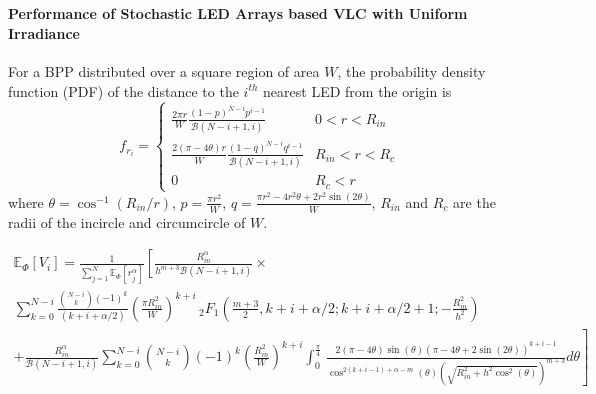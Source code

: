 \documentclass{beamer}
\providecommand{\sbrak}[1]{\ensuremath{{}\left[#1\right]}}
\providecommand{\lsbrak}[1]{\ensuremath{{}\left[#1\right.}}
\providecommand{\rsbrak}[1]{\ensuremath{{}\left.#1\right]}}
\providecommand{\brak}[1]{\ensuremath{\left(#1\right)}}
\theoremstyle{remark}
\begin{document}
\begin{frame}
\frametitle{\,}
\framesubtitle{Performance of Stochastic LED Arrays based VLC with Uniform Irradiance}

\begin{list}{}{}

\vfill
\item<1->
\footnotesize{
For a BPP distributed over a square region of area $W$,
the probability density function (PDF) of the distance to the $i^{th}$ nearest LED from the origin
is
%
\begin{equation}
f_{r_i}=\begin{cases} 
      \frac{2\pi r}{W}\frac{\brak{1-p}^{N-i}p^{i-1}}{\mathcal{B}\brak{N-i+1,i}} & 0 < r < R_{in}\\
      \frac{2\brak{\pi-4\theta} r}{W}\frac{\brak{1-q}^{N-i}q^{i-1}}{\mathcal{B}\brak{N-i+1,i}} & R_{in} < r < R_c \\
      0 &  R_c < r
   \end{cases}\nonumber
   \end{equation}
 where $\theta=\cos^{-1}\brak{R_{in}/r}$, $p=\frac{\pi r^2}{W}$, $q=\frac{\pi r^2-4r^2\theta+2 r^2\sin\brak{2\theta}}{W}$, $R_{in}$ and $R_c$ are the radii of the incircle and circumcircle of $W$.
 }
 \vfill

 \item<2>
\tiny{
\begin{multline}
\label{e_phi}
\mathbb{E}_{\Phi}\sbrak{V_i}
= \frac{1}{\sum_{j=1}^N\mathbb{E}_{\Phi}\sbrak{r_j^{\alpha}} }\lsbrak{\frac{R_{in}^{\alpha}}{h^{m+3}\mathcal{B}\brak{N-i+1,i}} \times} \\
\sum_{k=0}^{N-i}\frac{\binom{N-i}{k}(-1)^k}{\brak{k+i+\alpha/2}}\brak{\frac{\pi R_{in}^2}{W}}^{k+i}
   \,_2F_1\brak{\frac{m+3}{2},k+i+\alpha/2;k+i+\alpha/2+1;-\frac{R_{in}^2}{h^2}} 
\\
\rsbrak{+ \frac{R_{in}^{\alpha}}{\mathcal{B}\brak{N-i+1,i}}\sum_{k=0}^{N-i}\binom{N-i}{k}(-1)^k\brak{\frac{R_{in}^2}{W}}^{k+i}
   \int_{0}^{\frac{\pi}{4}} \frac{}{}
   \frac{2\brak{\pi-4\theta}\sin\brak{\theta}\brak{\pi -4\theta+2\sin\brak{2\theta}}^{k+i-1}}{\cos^{2\brak{k+i-1}+\alpha-m}\brak{\theta}\brak{\sqrt{R_{in}^2+h^2\cos^2\brak{\theta}}}^{m+3}} d \theta  }\nonumber
\end{multline}
}
 \end{list}
 
\end{frame}
\end{document}
